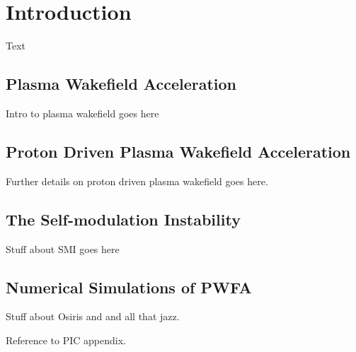 %
%

\chapter{Introduction}
\label{Ch:Intro}

Text

\section{Plasma Wakefield Acceleration}
\label{Int:PWFA}

Intro to plasma wakefield goes here

\section{Proton Driven Plasma Wakefield Acceleration}
\label{Int:PDPWFA}

Further details on proton driven plasma wakefield goes here.

\section{The Self-modulation Instability}
\label{Int:SMI}

Stuff about SMI goes here

\section{Numerical Simulations of PWFA}
\label{Int:Sim}

Stuff about Osiris and and all that jazz.

Reference to PIC appendix.

